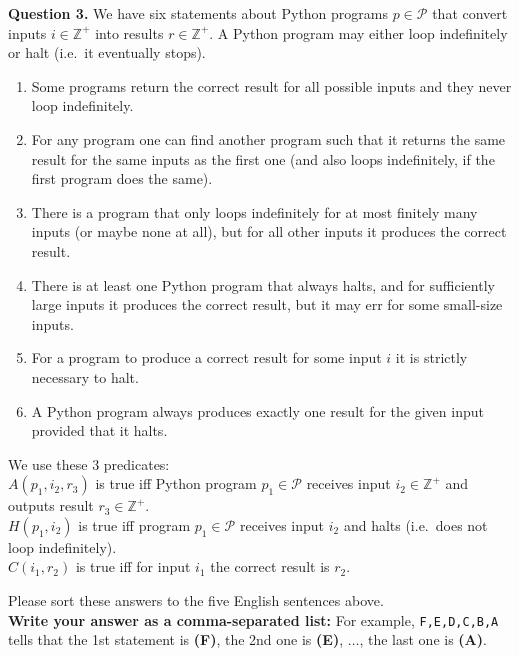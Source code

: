 \documentclass[jou]{apa6}
\begin{document}
\vspace{6pt}
{\bf Question 3.} We have six statements about Python programs $p \in \mathcal{P}$
that convert inputs $i \in \mathbb{Z}^{+}$ into results $r \in \mathbb{Z}^{+}$.  
A Python program may either loop indefinitely or halt (i.e.\ it eventually stops).

\begin{enumerate}
\item Some programs return the correct result for all possible inputs and 
they never loop indefinitely.
\item For any program one can find another program such that it returns
the same result for the same inputs as the first one (and also loops indefinitely, 
if the first program does the same).
\item There is a program that only loops indefinitely for at most finitely many inputs (or maybe none at all), 
but for all other inputs it produces the correct result.
\item There is at least one Python program that always halts, and for sufficiently large inputs it produces
the correct result, but it may err for some small-size inputs.
\item For a program to produce a correct result for some input $i$ it is strictly necessary to halt.\\
\item A Python program always produces exactly one result for the given input provided that it halts.
\end{enumerate}

We use these $3$ predicates:\\
$A(p_1,i_2,r_3)$ is true iff
Python program $p_1 \in \mathcal{P}$ receives input $i_2 \in \mathbb{Z}^{+}$ and outputs 
result $r_3 \in \mathbb{Z}^{+}$.\\
$H(p_1,i_2)$ is true iff program $p_1 \in \mathcal{P}$ receives input $i_2$ and halts (i.e.\ does not
loop indefinitely).\\
$C(i_1,r_2)$ is true iff for input $i_1$ the correct result is $r_2$. 

Please sort these answers to the five English sentences above.\\
{\bf Write your answer as a comma-separated list:} For example, 
{\tt F,E,D,C,B,A} tells that the 1st statement is {\bf (F)}, the 2nd one
is {\bf (E)}, $\ldots$, the 
last one is {\bf (A)}.
\end{document}
